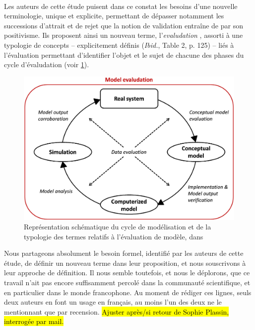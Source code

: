 \paragraph*{}
Les auteurs de cette étude puisent dans ce constat les besoins d'une nouvelle terminologie, unique et explicite, permettant de dépasser notamment les successions d'attrait et de rejet que la notion de validation entraîne de par son positivisme.
Ils proposent ainsi un nouveau terme, l'\og \textit{evaludation} \fg{}, assorti à une typologie de concepts -- explicitement définis (\textit{Ibid.}, Table 2, p. 125) -- liés à l'évaluation permettant d'identifier l'objet et le sujet de chacune des phases du cycle d'\og évaludation\fg{} (voir \cref{fig:schema_evaludationl}).

\begin{figure}[H]
	\includegraphics[width=\linewidth]{img/Schema_Augusiak_evaludation.png}
	\caption{Représentation schématique du cycle de modélisation et de la typologie des termes relatifs à l'évaluation de modèle, dans \cite[Fig. 1, p. 121]{augusiak_merging_2014}}
	\label{fig:schema_evaludationl}
\end{figure}

Nous partageons absolument le besoin formel, identifié par les auteurs de cette étude, de définir un nouveau terme dans leur proposition, et nous souscrivons à leur approche de définition.
Il nous semble toutefois, et nous le déplorons, que ce travail n'ait pas encore suffisamment percolé dans la communauté scientifique, et en particulier dans le monde francophone.
Au moment de rédiger ces lignes, seuls deux auteurs en font un usage en français, au moins l'un des deux \autocite[89,436]{rey-coyrehourcq_plateforme_2015} ne le mentionnant que par recension.
\hl{Ajuster après/si retour de Sophie Plassin, interrogée par mail.}


